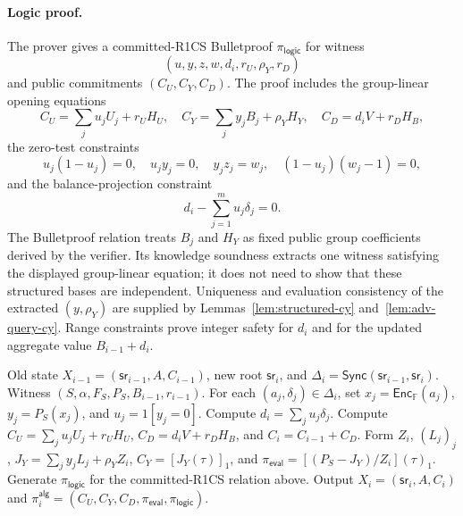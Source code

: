 \documentclass[runningheads]{llncs}
\newcommand{\F}{\mathbb{F}}
\newcommand{\Enc}{\mathsf{Enc}}
\newcommand{\sr}{\mathsf{sr}}
\newcommand{\Sync}{\mathsf{Sync}}
\newcommand{\dlist}{\Delta}
\begin{document}
\paragraph{Logic proof.}
The prover gives a committed-R1CS Bulletproof \(\pi_{\mathsf{logic}}\) for witness
\[
        (u,y,z,w,d_i,r_U,\rho_Y,r_D)
\]
and public commitments \((C_U,C_Y,C_D)\).  The proof includes the group-linear opening equations
\[
 C_U=\sum_j u_jU_j+r_UH_U,
\quad
 C_Y=\sum_j y_jB_j+\rho_YH_Y,
\quad
 C_D=d_iV+r_DH_B,
\]
the zero-test constraints
\[
 u_j(1-u_j)=0,
 \quad u_jy_j=0,
 \quad y_jz_j=w_j,
 \quad (1-u_j)(w_j-1)=0,
\]
and the balance-projection constraint
\[
        d_i-\sum_{j=1}^m u_j\delta_j=0.
\]
The Bulletproof relation treats \(B_j\) and \(H_Y\) as fixed public group coefficients derived by the verifier.  Its knowledge soundness extracts one witness satisfying the displayed group-linear equation; it does not need to show that these structured bases are independent.  Uniqueness and evaluation consistency of the extracted \((y,\rho_Y)\) are supplied by Lemmas~\ref{lem:structured-cy} and~\ref{lem:adv-query-cy}.
Range constraints prove integer safety for \(d_i\) and for the updated aggregate value \(B_{i-1}+d_i\).

\begin{algorithm}[t]
\caption{Algebraic fixed-set update}
\begin{algorithmic}[1]
\Require Old state \(X_{i-1}=(\sr_{i-1},A,C_{i-1})\), new root \(\sr_i\), and \(\dlist_i=\Sync(\sr_{i-1},\sr_i)\).
\Require Witness \((S,\alpha,F_S,P_S,B_{i-1},r_{i-1})\).
\State For each \((a_j,\delta_j)\in\dlist_i\), set \(x_j=\Enc_{\F}(a_j)\), \(y_j=P_S(x_j)\), and \(u_j=1[y_j=0]\).
\State Compute \(d_i=\sum_j u_j\delta_j\).
\State Compute \(C_U=\sum_j u_jU_j+r_UH_U\), \(C_D=d_iV+r_DH_B\), and \(C_i=C_{i-1}+C_D\).
\State Form \(Z_i\), \((L_j)_j\), \(J_Y=\sum_j y_jL_j+\rho_YZ_i\), \(C_Y=[J_Y(\tau)]_1\), and \(\pi_{\mathsf{eval}}=[(P_S-J_Y)/Z_i](\tau)_1\).
\State Generate \(\pi_{\mathsf{logic}}\) for the committed-R1CS relation above.
\State Output \(X_i=(\sr_i,A,C_i)\) and \(\pi_i^{\mathsf{alg}}=(C_U,C_Y,C_D,\pi_{\mathsf{eval}},\pi_{\mathsf{logic}})\).
\end{algorithmic}
\end{algorithm}
\end{document}

